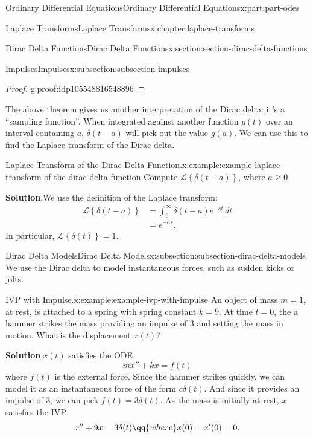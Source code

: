 \documentclass[twoside,10pt,]{book}
\newcommand{\blocktitlefont}{\relax}
\numberwithin{equation}{part}
\newcommand{\Laplace}[1]{\mathcal{L}\left\{#1\right\}}
\newcommand{\amp}{&}
\begin{document}
\begin{partptx}{Ordinary Differential Equations}{}{Ordinary Differential Equations}{}{}{x:part:part-odes}
\begin{chapterptx}{Laplace Transforms}{}{Laplace Transforms}{}{}{x:chapter:laplace-transforms}
\begin{sectionptx}{Dirac Delta Functions}{}{Dirac Delta Functions}{}{}{x:section:section-dirac-delta-functions}
\begin{subsectionptx}{Impulses}{}{Impulses}{}{}{x:subsection:subsection-impulses}
\begin{proof}{}{g:proof:idp105548816548896}
%
\end{proof}
The above theorem gives us another interpretation of the Dirac delta: it's a ``sampling function''. When integrated against another function \(g(t)\) over an interval containing \(a\), \(\delta(t-a)\) will pick out the value \(g(a)\). We can use this to find the Laplace transform of the Dirac delta.%
\begin{example}{Laplace Transform of the Dirac Delta Function.}{x:example:example-laplace-transform-of-the-dirac-delta-function}%
Compute \(\Laplace{\delta(t-a)}\), where \(a\geq0\).%
\par\smallskip%
\noindent\textbf{\blocktitlefont Solution}.\hypertarget{g:solution:idp105548816717728}{}\quad{}We use the definition of the Laplace transform:%
\begin{align*}
\Laplace{\delta(t-a)} \amp= \int_{0}^{\infty}\delta(t-a)e^{-st}\,dt\\
\amp= e^{-as}\text{.}
\end{align*}
In particular, \(\Laplace{\delta(t)} = 1\).%
\end{example}
\end{subsectionptx}
%
%
\typeout{************************************************}
\typeout{************************************************}
%
\begin{subsectionptx}{Dirac Delta Models}{}{Dirac Delta Models}{}{}{x:subsection:subsection-dirac-delta-models}
We use the Dirac delta to model instantaneous forces, such as sudden kicks or jolts.%
\begin{example}{IVP with Impulse.}{x:example:example-ivp-with-impulse}%
An object of mass \(m=1\), at rest, is attached to a spring with spring constant \(k=9\). At time \(t=0\), the a hammer strikes the mass providing an impulse of \(3\) and setting the mass in motion. What is the displacement \(x(t)\)?%
\par\smallskip%
\noindent\textbf{\blocktitlefont Solution}.\hypertarget{g:solution:idp105548816723488}{}\quad{}\(x(t)\) satisfies the ODE%
\begin{equation*}
mx''+kx = f(t)
\end{equation*}
where \(f(t)\) is the external force. Since the hammer strikes quickly, we can model it as an instantaneous force of the form \(c\delta(t)\). And since it provides an impulse of \(3\), we can pick \(f(t) = 3\delta(t)\). As the mass is initially at rest, \(x\) satisfies the IVP%
\begin{equation*}
x''+9x = 3\delta(t)\qq{where}x(0) = x'(0) = 0.

\end{equation*}
\end{example}
\end{subsectionptx}
\end{sectionptx}
\end{chapterptx}
\end{partptx}
\end{document}

